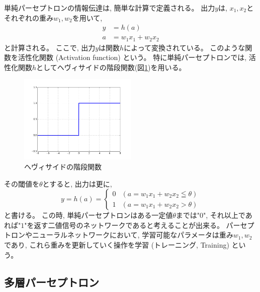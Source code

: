 単純パーセプトロンの情報伝達は, 簡単な計算で定義される。
出力$y$は, $x_1,x_2$とそれぞれの重み$w_1,w_2$を用いて, 
\begin{equation}
 \begin{split}
  y &= h(a)\\
  a &= w_1x_1 + w_2x_2
 \end{split}
\end{equation}
と計算される。
ここで, 出力$y$は関数$h$によって変換されている。
このような関数を活性化関数 (Activation function) という。
特に単純パーセプトロンでは, 活性化関数$h$としてヘヴィサイドの階段関数(図\ref{3HeavisideStepFunction})を用いる。

\begin{figure}[htbp]
 \centering
 \includegraphics[width=0.5\textwidth]{Figure/2DeepLearning/3HeavisideStepFunction.png}
 \caption{ヘヴィサイドの階段関数}
 \label{3HeavisideStepFunction}
\end{figure}

その閾値を$\theta$とすると, 出力は更に, 
\begin{equation}
 y = h(a) = \left\{ \begin{array}{ll}
    0 & (a = w_1x_1 + w_2x_2 \leqq \theta) \\
    1 & (a = w_1x_1 + w_2x_2 > \theta)
 \end{array} \right.
\end{equation}
と書ける。
この時, 単純パーセプトロンはある一定値$\theta$までは"$0$", それ以上であれば"$1$"を返す二値信号のネットワークであると考えることが出来る。
パーセプトロンやニューラルネットワークにおいて, 学習可能なパラメータは重み$w_1,w_2$であり, これら重みを更新していく操作を学習 (トレーニング, Training) という。


\subsection{多層パーセプトロン} \label{DL:Percep:MultiLayerPerceptron}

